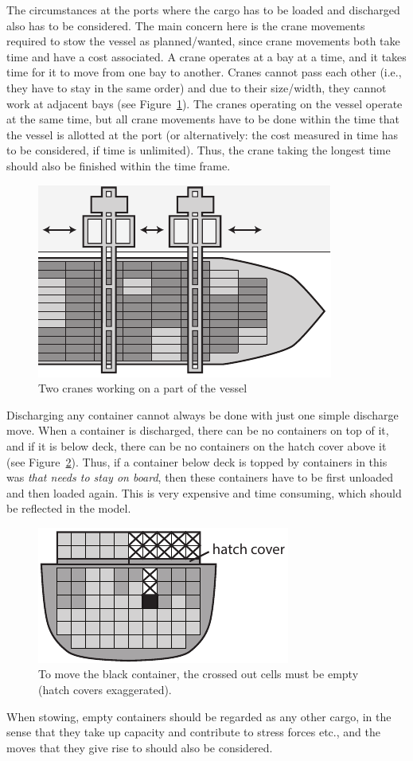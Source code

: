 The circumstances at the ports where the cargo has to be loaded and discharged also has to be considered. 
The main concern here is the crane movements required to stow the vessel as planned/wanted, since crane movements both take time and have a cost associated. 
A crane operates at a bay at a time, and it takes time for it to move from one bay to another. Cranes cannot pass each other (i.e., they have to stay in the same order) and due to their size/width, they cannot work at adjacent bays (see Figure~\ref{fig:cranes}). The cranes operating on the vessel operate at the same time, but all crane movements have to be done within the time that the vessel is allotted at the port (or alternatively: the cost measured in time has to be considered, if time is unlimited). Thus, the crane taking the longest time should also be finished within the time frame.

\begin{figure}
	\centering
		\includegraphics[scale=0.8]{figures/cranes.pdf}
	\caption{Two cranes working on a part of the vessel}
	\label{fig:cranes}
\end{figure}

Discharging any container cannot always be done with just one simple discharge move. When a container is discharged, there can be no containers on top of it, and if it is below deck, there can be no containers on the hatch cover above it (see Figure~\ref{fig:overstowA}). Thus, if a container below deck is topped by containers in this was \emph{that needs to stay on board}, then these containers have to be first unloaded and then loaded again. This is very expensive and time consuming, which should be reflected in the model. 

\begin{figure}
	\centering
		\includegraphics[scale=0.9]{figures/overstow.pdf}
	\caption{To move the black container, the crossed out cells must be empty (hatch covers exaggerated).}
	\label{fig:overstowA}
\end{figure}

When stowing, empty containers should be regarded as any other cargo, in the sense that they take up capacity and contribute to stress forces etc., and the moves that they give rise to should also be considered.    